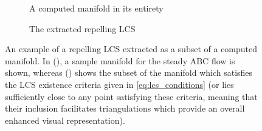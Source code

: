 \begin{figure}[htpb]
    \centering
    \begin{subfigure}[b]{0.475\textwidth}
        \centering
        \caption[]{{\small A computed manifold in its entirety}}
        \label{fig:mf_conversion_mf}
    \end{subfigure}
    \begin{subfigure}[b]{0.475\textwidth}
        \centering
        \caption[]{{\small The extracted repelling LCS}}
        \label{fig:mf_conversion_lcs}
    \end{subfigure}
    \caption[An example of a repelling LCS extracted as a subset of a computed
    manifold]
    {An example of a repelling LCS extracted as a subset of a computed
        manifold. In (), a sample manifold for
        the steady ABC flow is shown, whereas ()
        shows the subset of the manifold which satisfies the LCS existence
        criteria given in \cref{eq:lcs_conditions} (or lies sufficiently close
        to any point satisfying these criteria, meaning that their inclusion
        facilitates triangulations which provide an overall enhanced visual
        representation).
    }
    \label{fig:manifold_lcs_conversion}
\end{figure}

